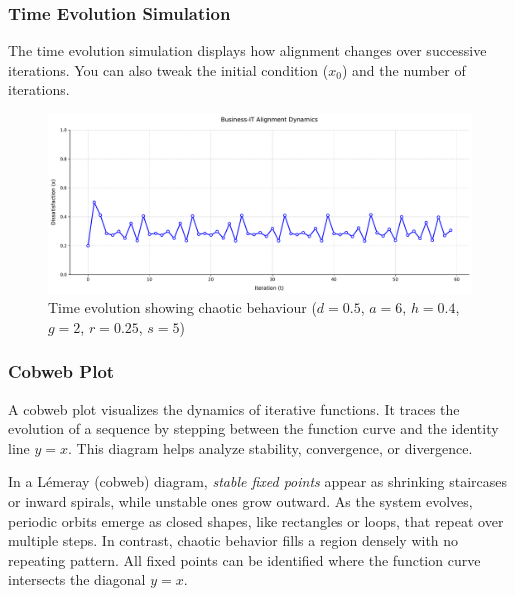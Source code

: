 \documentclass[a4paper, 10pt]{article}
\begin{document}
\subsubsection{Time Evolution Simulation}
The time evolution simulation displays how alignment changes over successive iterations.
You can also tweak the initial condition ($x_0$) and the number of iterations. 

\begin{figure}[h]
	\centering
	\includegraphics[width=1\textwidth]{../images/results/time-evolution.pdf}
	\caption{Time evolution showing chaotic behaviour ($d = 0.5$, $a = 6$, $h = 0.4$, $g = 2$, $r = 0.25$, $s = 5$)}
	\label{fig:time_sim}
\end{figure}

\subsubsection{Cobweb Plot}
A cobweb plot visualizes the dynamics of iterative functions. 
It traces the evolution of a sequence by stepping between the function curve and the identity line $y = x$. This diagram helps analyze stability, convergence, or divergence. 

In a Lémeray (cobweb) diagram, \textit{stable fixed points} appear as shrinking staircases or inward spirals, while unstable ones grow outward.
As the system evolves, periodic orbits emerge as closed shapes, like rectangles or loops, that repeat over multiple steps.
In contrast, chaotic behavior fills a region densely with no repeating pattern.
All fixed points can be identified where the function curve intersects the diagonal $y = x$.
\end{document}
